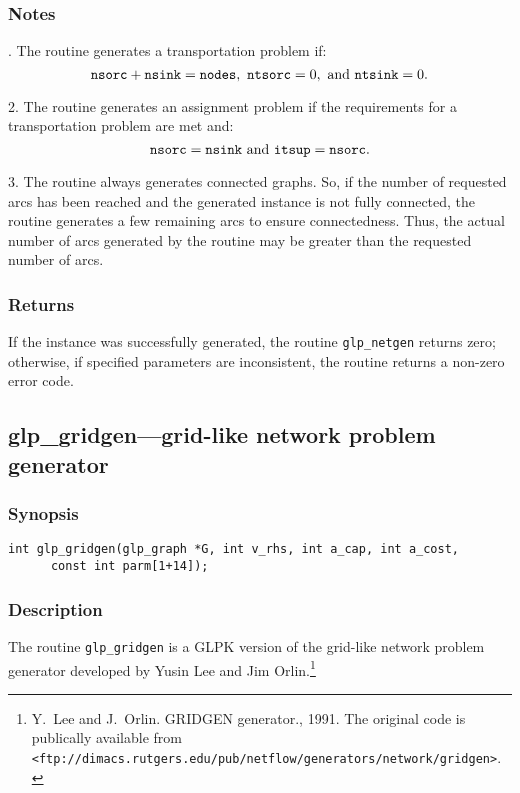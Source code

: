 \subsubsection*{Notes}

\noindent{}. The routine generates a transportation problem if:
$${\tt nsorc}+{\tt nsink}={\tt nodes},
\  {\tt ntsorc}=0,\ \mbox{and}\ {\tt ntsink}=0.$$

2. The routine generates an assignment problem if the requirements for
a transportation problem are met and:
$${\tt nsorc}={\tt nsink}\ \mbox{and}\ {\tt itsup}={\tt nsorc}.$$

3. The routine always generates connected graphs. So, if the number of
requested arcs has been reached and the generated instance is not fully
connected, the routine generates a few remaining arcs to ensure
connectedness. Thus, the actual number of arcs generated by the routine
may be greater than the requested number of arcs.

\subsubsection*{Returns}

If the instance was successfully generated, the routine
\verb|glp_netgen| returns zero; otherwise, if specified parameters are
inconsistent, the routine returns a non-zero error code.

\subsection{glp\_gridgen---grid-like network problem generator}

\subsubsection*{Synopsis}

\begin{verbatim}
int glp_gridgen(glp_graph *G, int v_rhs, int a_cap, int a_cost,
      const int parm[1+14]);
\end{verbatim}

\subsubsection*{Description}

The routine \verb|glp_gridgen| is a GLPK version of the grid-like
network problem generator developed by Yusin Lee and Jim
Orlin.\footnote{Y.~Lee and J.~Orlin. GRIDGEN generator., 1991. The
original code is publically available from
{\tt<ftp://dimacs.rutgers.edu/pub/netflow/generators/network/gridgen>}.}

